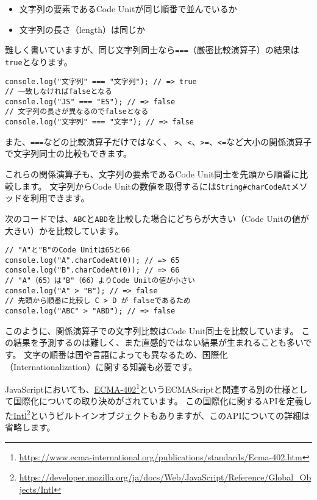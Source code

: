 \begin{itemize}
\item
  文字列の要素であるCode Unitが同じ順番で並んでいるか
\item
  文字列の長さ（length）は同じか
\end{itemize}

難しく書いていますが、同じ文字列同士なら\texttt{===}（厳密比較演算子）の結果は\texttt{true}となります。

\begin{lstlisting}
console.log("文字列" === "文字列"); // => true
// 一致しなければfalseとなる
console.log("JS" === "ES"); // => false
// 文字列の長さが異なるのでfalseとなる
console.log("文字列" === "文字"); // => false
\end{lstlisting}

また、\texttt{===}などの比較演算子だけではなく、
\texttt{>}、\texttt{<}、\texttt{>=}、\texttt{<=}など大小の関係演算子で文字列同士の比較もできます。

これらの関係演算子も、文字列の要素であるCode
Unit同士を先頭から順番に比較します。 文字列からCode
Unitの数値を取得するには\texttt{String\#charCodeAt}メソッドを利用できます。

次のコードでは、\texttt{ABC}と\texttt{ABD}を比較した場合にどちらが大きい（Code
Unitの値が大きい）かを比較しています。

\begin{lstlisting}
// "A"と"B"のCode Unitは65と66
console.log("A".charCodeAt(0)); // => 65
console.log("B".charCodeAt(0)); // => 66
// "A"（65）は"B"（66）よりCode Unitの値が小さい
console.log("A" > "B"); // => false
// 先頭から順番に比較し C > D が falseであるため
console.log("ABC" > "ABD"); // => false
\end{lstlisting}

このように、関係演算子での文字列比較はCode Unit同士を比較しています。
この結果を予測するのは難しく、また直感的ではない結果が生まれることも多いです。
文字の順番は国や言語によっても異なるため、国際化（Internationalization）に関する知識も必要です。

JavaScriptにおいても、\href{https://www.ecma-international.org/publications/standards/Ecma-402.htm}{ECMA-402}\footnote{\url{https://www.ecma-international.org/publications/standards/Ecma-402.htm}}というECMAScriptと関連する別の仕様として国際化についての取り決めがされています。
この国際化に関するAPIを定義した\href{https://developer.mozilla.org/ja/docs/Web/JavaScript/Reference/Global_Objects/Intl}{Intl}\footnote{\url{https://developer.mozilla.org/ja/docs/Web/JavaScript/Reference/Global_Objects/Intl}}というビルトインオブジェクトもありますが、このAPIについての詳細は省略します。

